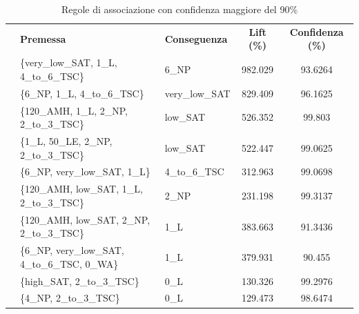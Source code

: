 \documentclass[a4paper]{article}
\newcounter{rowno}
\begin{document}
\begin{table}[h]
\centering
\begingroup
\setlength{\tabcolsep}{5pt} %
\renewcommand{\arraystretch}{1} %
\setcounter{rowno}{0}

\begin{tabularx}{\textwidth}{|>{\stepcounter{rowno}\therowno}c|X|l|c|c|}
\hline
\multicolumn{1}{r}{\#} & {\textbf{Premessa}} & {\textbf{Conseguenza}} & {\textbf{Lift (\%)}} & {\textbf{Confidenza (\%)}} \\

& \{very\_low\_SAT, 1\_L, 4\_to\_6\_TSC\} & 6\_NP & 982.029 & 93.6264 \\ 
& \{6\_NP, 1\_L, 4\_to\_6\_TSC\} & very\_low\_SAT & 829.409 & 96.1625 \\ 
& \{120\_AMH, 1\_L, 2\_NP, 2\_to\_3\_TSC\} & low\_SAT & 526.352 & 99.803 \\ 
& \{1\_L, 50\_LE, 2\_NP, 2\_to\_3\_TSC\} & low\_SAT & 522.447 & 99.0625 \\ 
& \{6\_NP, very\_low\_SAT, 1\_L\} & 4\_to\_6\_TSC & 312.963 & 99.0698 \\ 
& \{120\_AMH, low\_SAT, 1\_L, 2\_to\_3\_TSC\} & 2\_NP & 231.198 & 99.3137 \\ 
& \{120\_AMH, low\_SAT, 2\_NP, 2\_to\_3\_TSC\} & 1\_L & 383.663 & 91.3436 \\ 
& \{6\_NP, very\_low\_SAT, 4\_to\_6\_TSC, 0\_WA\} & 1\_L & 379.931 & 90.455 \\ 
& \{high\_SAT, 2\_to\_3\_TSC\} & 0\_L & 130.326 & 99.2976 \\ 
& \{4\_NP, 2\_to\_3\_TSC\} & 0\_L & 129.473 & 98.6474 \\ 
\hline
\end{tabularx}
\endgroup
\caption{Regole di associazione con confidenza maggiore del 90\%}
\label{tab:rules_conf_90_101}
\end{table}
\end{document}
